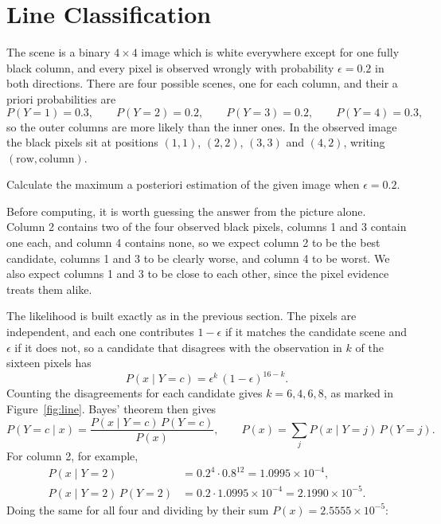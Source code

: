 \documentclass[11pt]{article}
\begin{document}
\section{Line Classification}

The scene is a binary $4\times4$ image which is white everywhere except for
one fully black column, and every pixel is observed wrongly with probability
$\epsilon = 0.2$ in both directions. There are four possible scenes, one for
each column, and their a priori probabilities are
\[
    P(Y=1) = 0.3, \qquad P(Y=2) = 0.2, \qquad P(Y=3) = 0.2,
    \qquad P(Y=4) = 0.3,
\]
so the outer columns are more likely than the inner ones. In the observed
image the black pixels sit at positions $(1,1)$, $(2,2)$, $(3,3)$ and $(4,2)$,
writing $(\text{row},\text{column})$.

\begin{question}
Calculate the maximum a posteriori estimation of the given image when
$\epsilon = 0.2$.
\end{question}

Before computing, it is worth guessing the answer from the picture alone.
Column 2 contains two of the four observed black pixels, columns 1 and 3
contain one each, and column 4 contains none, so we expect column 2 to be the
best candidate, columns 1 and 3 to be clearly worse, and column 4 to be worst.
We also expect columns 1 and 3 to be close to each other, since the pixel
evidence treats them alike.

The likelihood is built exactly as in the previous section. The pixels are
independent, and each one contributes $1-\epsilon$ if it matches the candidate
scene and $\epsilon$ if it does not, so a candidate that disagrees with the
observation in $k$ of the sixteen pixels has
\[
    P(x \mid Y=c) = \epsilon^{k}\,(1-\epsilon)^{16-k}.
\]
Counting the disagreements for each candidate gives $k = 6, 4, 6, 8$, as
marked in Figure~\ref{fig:line}. Bayes' theorem then gives
\[
    P(Y=c \mid x) = \frac{P(x \mid Y=c)\,P(Y=c)}{P(x)},
    \qquad
    P(x) = \sum_{j} P(x \mid Y=j)\,P(Y=j).
\]
For column 2, for example,
\begin{align*}
    P(x \mid Y=2) &= 0.2^4 \cdot 0.8^{12} = 1.0995 \times 10^{-4}, \\
    P(x \mid Y=2)\,P(Y=2) &= 0.2 \cdot 1.0995 \times 10^{-4}
      = 2.1990 \times 10^{-5}.
\end{align*}
Doing the same for all four and dividing by their sum
$P(x) = 2.5555 \times 10^{-5}$:
\end{document}
